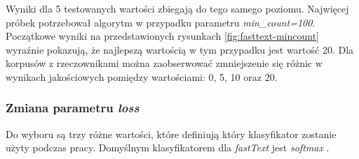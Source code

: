Wyniki dla 5 testowanych wartości zbiegają do tego samego poziomu. Najwięcej próbek potrzebował algorytm w przypadku parametru \textit{min\_count=100}. Początkowe wyniki na przedstawionych rysunkach \ref{fig:fasttext-mincount} wyraźnie pokazują, że najlepszą wartością w tym przypadku jest wartość 20. Dla korpusów z rzeczownikami można zaobserwować zmniejszenie się różnic w wynikach jakościowych pomiędzy wartościami: 0, 5, 10 oraz 20.
\newpage
\subsubsection{Zmiana parametru \textit{loss}}
Do wyboru są trzy różne wartości, które definiują który klasyfikator zostanie użyty podczas pracy. Domyślnym klasyfikatorem dla \textit{fastText} jest \textit{softmax} \cite{walkowiak2018}.


